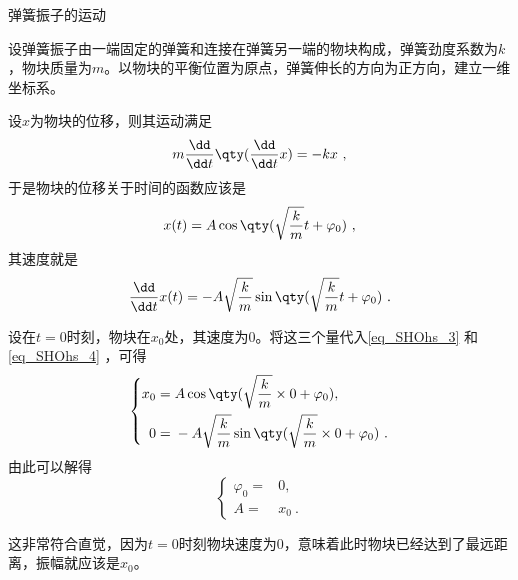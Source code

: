 \begin{example}{弹簧振子的运动}

设弹簧振子由一端固定的弹簧和连接在弹簧另一端的物块构成，弹簧劲度系数为$k$，物块质量为$m$。以物块的平衡位置为原点，弹簧伸长的方向为正方向，建立一维坐标系。

设$x$为物块的位移，则其运动满足
\begin{equation}
m\frac{\dd}{\dd t}\qty(\frac{\dd}{\dd t}x) = -kx~, 
\end{equation}
于是物块的位移关于时间的函数应该是
\begin{equation}\label{eq_SHOhs_3}
x(t) = A\cos\qty(\sqrt{\frac{k}{m}}t+\varphi_0)~, 
\end{equation}
其速度就是
\begin{equation}\label{eq_SHOhs_4}
\frac{\dd}{\dd t}x(t) = -A\sqrt{\frac{k}{m}}\sin\qty(\sqrt{\frac{k}{m}}t+\varphi_0)~. 
\end{equation}

设在$t=0$时刻，物块在$x_0$处，其速度为$0$。将这三个量代入\autoref{eq_SHOhs_3} 和\autoref{eq_SHOhs_4} ，可得
\begin{equation}
\left\{
\begin{aligned}
x_0 ={}& A\cos\qty(\sqrt{\frac{k}{m}}\times0+\varphi_0), \\
0 ={}& -A\sqrt{\frac{k}{m}}\sin\qty(\sqrt{\frac{k}{m}}\times 0+\varphi_0)~. 
\end{aligned}
\right. 
\end{equation}
由此可以解得
\begin{equation}
\left\{
\begin{aligned}
\varphi_0 ={}& 0, \\
A ={}& x_0~. 
\end{aligned}
\right. 
\end{equation}

这非常符合直觉，因为$t=0$时刻物块速度为$0$，意味着此时物块已经达到了最远距离，振幅就应该是$x_0$。

\end{example}


























